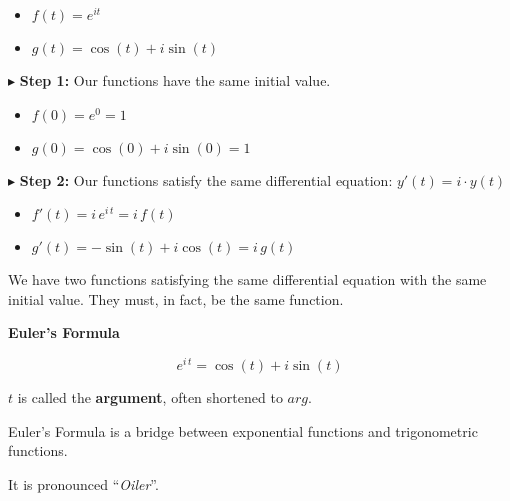 \documentclass{ximera}
\begin{document}
\begin{itemize}
	\item $f(t) = e^{i t}$
	\item $g(t) = \cos(t) + i \sin(t)$
\end{itemize}




$\blacktriangleright$   \textbf{Step 1:} Our functions have the same initial value.

\begin{itemize}
	\item $f(0) = e^0 = 1$
	\item $g(0) = \cos(0) + i \sin(0) = 1$
\end{itemize}





$\blacktriangleright$   \textbf{Step 2:} Our functions satisfy the same differential equation: $y'(t) = i \cdot y(t)$



\begin{itemize}
	\item $f'(t) = i \, e^{i \, t} = i \, f(t)$
	\item $g'(t) = -\sin(t) + i \cos(t) = i \, g(t)$
\end{itemize}



We have two functions satisfying the same differential equation with the same initial value.  They must, in fact, be the same function. \\




\begin{theorem} \textbf{\textcolor{green!50!black}{Euler's Formula}}   


\[   e^{i \, t} = \cos(t) + i \sin(t)         \]



$t$ is called the \textbf{argument}, often shortened to \textbf{\textcolor{green!50!black}{$arg$}}.  

\end{theorem}




Euler's Formula is a bridge between exponential functions and trigonometric functions. \\


\begin{center}

It is pronounced ``\textit{Oiler}''.


\end{center}
\end{document}
